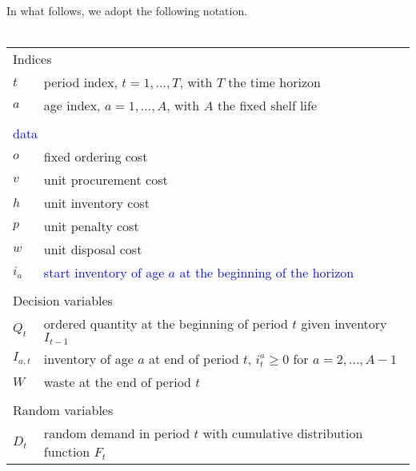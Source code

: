 \documentclass{tPRS2e}
\newcommand{\blue}{\textcolor{blue}}
\begin{document}
In what follows, we adopt the following notation.\\
	\\
	\noindent
	\begin{tabular}{ll}
		\multicolumn{2}{l}{Indices}\\
		$t$ & period index, $t=1,\ldots,T$, with $T$ the time horizon\\
		$a$ & age index, $a=1,\ldots,A$, with $A$ the fixed shelf life\\
		\\
		\multicolumn{2}{l}{\blue{data}}\\
		$o$ & fixed ordering cost\\
		$v$ & unit procurement cost\\
		$h$ & unit inventory cost\\
		$p$ & unit penalty cost \\
		$w$ & unit disposal cost\\
		$i_a$ & \blue{start inventory of age $a$ at the beginning of the horizon}\\
		\\
		\multicolumn{2}{l}{Decision variables}\\
		$Q_t$ & ordered quantity at the beginning of period $t$ given inventory $I_{t-1}$\\
		$I_{a,t}$ 	& inventory of age $a$ at end of period $t$, $i_t^a \ge 0$ for $a=2,\ldots,A-1$\\
		$W$ 	& waste at the end of period $t$\\		 
		\\	
		\multicolumn{2}{l}{Random variables}\\
		$D_t$ 	& random demand in period $t$ with cumulative distribution function $F_t$\\
	\end{tabular}
	
\end{document}
